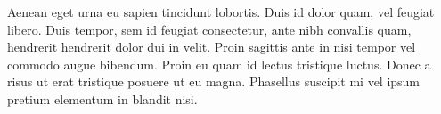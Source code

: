 Aenean eget urna eu sapien tincidunt lobortis. Duis id dolor quam, vel feugiat libero. Duis tempor, sem id feugiat consectetur, ante nibh convallis quam, hendrerit hendrerit dolor dui in velit. Proin sagittis ante in nisi tempor vel commodo augue bibendum. Proin eu quam id lectus tristique luctus. Donec a risus ut erat tristique posuere ut eu magna. Phasellus suscipit mi vel ipsum pretium elementum in blandit nisi.
